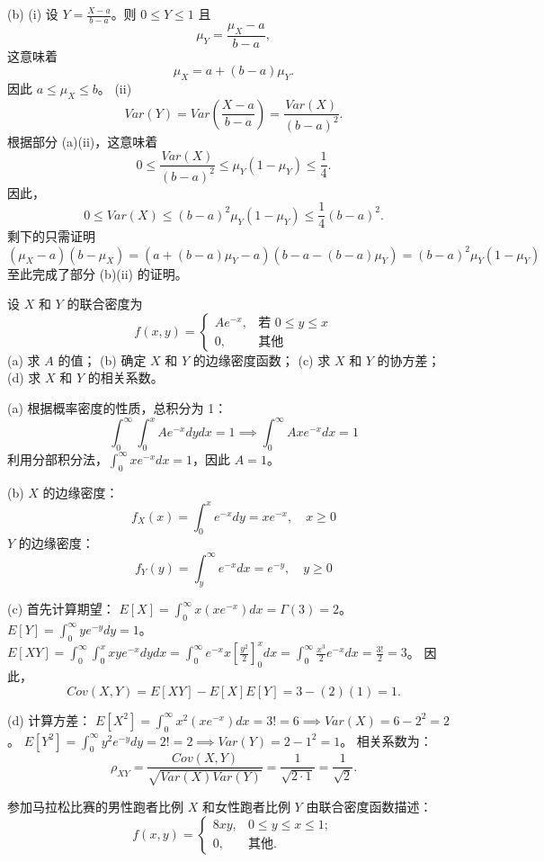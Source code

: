 \begin{questions}
\begin{solution}
(b) (i) 设 $Y = \frac{X - a}{b - a}$。则 $0 \le Y \le 1$ 且
\[
\mu_Y = \frac{\mu_X - a}{b - a},
\]
这意味着
\[
\mu_X = a + (b - a)\mu_Y.
\]
因此 $a \le \mu_X \le b$。
(ii) 
\[
Var(Y) = Var\left( \frac{X - a}{b - a} \right) = \frac{Var(X)}{(b - a)^2}.
\]
根据部分 (a)(ii)，这意味着
\[
0 \le \frac{Var(X)}{(b - a)^2} \le \mu_Y(1 - \mu_Y) \le \frac{1}{4}.
\]
因此，
\[
0 \le Var(X) \le (b - a)^2 \mu_Y(1 - \mu_Y) \le \frac{1}{4}(b - a)^2.
\]
剩下的只需证明
\[
(\mu_X - a)(b - \mu_X) = (a + (b - a)\mu_Y - a)(b - a - (b - a)\mu_Y) = (b - a)^2 \mu_Y(1 - \mu_Y)
\]
至此完成了部分 (b)(ii) 的证明。
\end{solution}

\question
设 $X$ 和 $Y$ 的联合密度为
\[
f(x, y) = \begin{cases} Ae^{-x}, & \text{若 } 0 \le y \le x \\ 0, & \text{其他} \end{cases}
\]
(a) 求 $A$ 的值；
(b) 确定 $X$ 和 $Y$ 的边缘密度函数；
(c) 求 $X$ 和 $Y$ 的协方差；
(d) 求 $X$ 和 $Y$ 的相关系数。

\begin{solution}
(a) 根据概率密度的性质，总积分为 1：
\[
\int_0^{\infty} \int_0^x Ae^{-x} dy dx = 1 \implies \int_0^{\infty} Axe^{-x} dx = 1
\]
利用分部积分法，$\int_0^{\infty} xe^{-x} dx = 1$，因此 $A = 1$。

(b) $X$ 的边缘密度：
\[
f_X(x) = \int_0^x e^{-x} dy = xe^{-x}, \quad x \ge 0
\]
$Y$ 的边缘密度：
\[
f_Y(y) = \int_y^{\infty} e^{-x} dx = e^{-y}, \quad y \ge 0
\]

(c) 首先计算期望：
$E[X] = \int_0^{\infty} x(xe^{-x}) dx = \Gamma(3) = 2$。
$E[Y] = \int_0^{\infty} y e^{-y} dy = 1$。
$E[XY] = \int_0^{\infty} \int_0^x xy e^{-x} dy dx = \int_0^{\infty} e^{-x} x \left[ \frac{y^2}{2} \right]_0^x dx = \int_0^{\infty} \frac{x^3}{2} e^{-x} dx = \frac{3!}{2} = 3$。
因此，
\[
Cov(X, Y) = E[XY] - E[X]E[Y] = 3 - (2)(1) = 1.
\]

(d) 计算方差：
$E[X^2] = \int_0^{\infty} x^2 (xe^{-x}) dx = 3! = 6 \implies Var(X) = 6 - 2^2 = 2$。
$E[Y^2] = \int_0^{\infty} y^2 e^{-y} dy = 2! = 2 \implies Var(Y) = 2 - 1^2 = 1$。
相关系数为：
\[
\rho_{XY} = \frac{Cov(X, Y)}{\sqrt{Var(X)Var(Y)}} = \frac{1}{\sqrt{2 \cdot 1}} = \frac{1}{\sqrt{2}}.
\]
\end{solution}

\question
参加马拉松比赛的男性跑者比例 $X$ 和女性跑者比例 $Y$ 由联合密度函数描述：
\[
f(x, y) = \begin{cases} 8xy, & 0 \leq y \leq x \leq 1; \\ 0, & \text{其他}. \end{cases}
\]


\end{questions}
